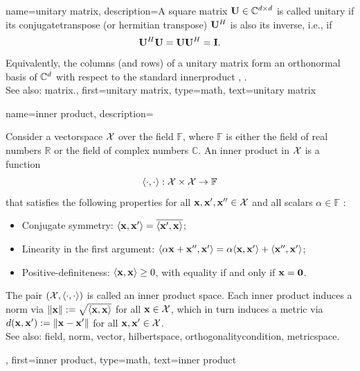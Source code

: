 {name={unitary matrix},
	description={A square \gls{matrix} $\mathbf{U} \in \mathbb{C}^{d \times d}$ 
		is called unitary if its \gls{conjugatetranspose} 
		(or \gls{hermitian} \gls{transpose}) $\mathbf{U}^{H}$ is also its \gls{inverse}, i.e., if
 		\[
 			\mathbf{U}^{H} \mathbf{U} = \mathbf{U} \mathbf{U}^{H} = \mathbf{I}.
 		\]
 		Equivalently, the columns (and rows) of a unitary \gls{matrix} form an 
		orthonormal \gls{basis} of $\mathbb{C}^{d}$ with respect to the standard 
		\gls{innerproduct} \cite{HornMatAnalysis}, \cite{Axler2025}. 
 		\\
 		See also: \gls{matrix}.},
 	first={unitary matrix},
 	type=math,
 	text={unitary matrix}
}

{name={inner product},
	description={Consider a \gls{vectorspace} $\mathcal{X}$ over the 
		\gls{field} $\mathbb{F}$, where $\mathbb{F}$ is either the \gls{field} of 
		real numbers $\mathbb{R}$ or the \gls{field} of complex numbers $\mathbb{C}$. 
		An inner product in $\mathcal{X}$ is 
		a \gls{function} 
 		\[
 			\langle \cdot, \cdot \rangle: \mathcal{X} \times \mathcal{X} \to \mathbb{F}
 		\]
 		that satisfies the following properties for all 
		${\bf x}, {\bf x}', {\bf x}'' \in \mathcal{X}$ 
		and all scalars $\alpha \in \mathbb{F}$ \cite{Axler2025}:
 		\begin{itemize}
 			\item Conjugate symmetry: $\langle {\bf x}, {\bf x}' \rangle = \overline{\langle {\bf x}', {\bf x} \rangle}$;
 			\item Linearity in the first argument: $\langle \alpha {\bf x} + {\bf x}'', {\bf x}' \rangle = \alpha \langle {\bf x}, {\bf x}' \rangle + \langle {\bf x}'', {\bf x}' \rangle$;
 			\item Positive-definiteness: $\langle {\bf x}, {\bf x} \rangle \geq 0$, with equality if and only if ${\bf x} = \mathbf{0}$.
 		\end{itemize}
 		The pair $(\mathcal{X}, \langle \cdot, \cdot \rangle)$ is called an inner product space. 
		Each inner product induces a \gls{norm} via 
		$\Vert {{\bf x}} \Vert := \sqrt{\langle {\bf x}, {\bf x} \rangle}$ for all 
		${\bf x} \in \mathcal{X}$, which in turn induces a \gls{metric} via 
		$d({\bf x},{\bf x}') := \Vert {{\bf x}- {\bf x}'} \Vert$
		for all ${\bf x}, {\bf x}' \in \mathcal{X}$.
 		\\
 		See also: \gls{field}, \gls{norm}, \gls{vector}, \gls{hilbertspace}, \gls{orthogonalitycondition}, \gls{metricspace}.},
 	first={inner product},
 	type=math,
 	text={inner product}
}

